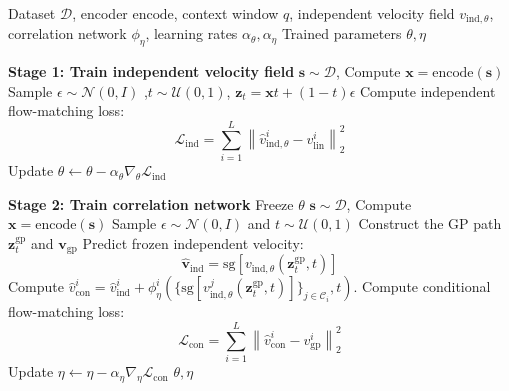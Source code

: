 \documentclass{article} %
\begin{document}
\begin{algorithm}[t]
\caption{Two-stage training of Correlation-aware Flow}
\label{alg:training}
\begin{algorithmic}[1]
\Require Dataset $\mathcal{D}$, encoder $\mathrm{encode}$, context window $q$, independent velocity field $v_{\mathrm{ind},\theta}$, correlation network $\phi_\eta$, learning rates $\alpha_\theta,\alpha_\eta$
\Ensure Trained parameters $\theta,\eta$

\Statex \textbf{Stage 1: Train independent velocity field}
    \State $\mathbf{s} \sim \mathcal{D} $, Compute  $\mathbf{x} = \mathrm{encode}(\mathbf{s})$
    \State Sample $\epsilon \sim \mathcal{N}(0,I)$ ,$t \sim \mathcal{U}(0,1)$, $\mathbf{z}_t = \mathbf{x} t + (1-t) \epsilon$
    \State Compute independent flow-matching loss:
    \[
        \mathcal{L}_{\mathrm{ind}}
        =
        \sum_{i=1}^{L}
        \left\|
            \widehat{v}^{i}_{\mathrm{ind}, \theta}
            -
            v^{i}_{\mathrm{lin}}
        \right\|_2^2
    \]
    \State Update $\theta \leftarrow \theta - \alpha_\theta \nabla_\theta \mathcal{L}_{\mathrm{ind}}$
\EndFor

\Statex \textbf{Stage 2: Train correlation network}
\State Freeze $\theta$
    \State $\mathbf{s} \sim \mathcal{D}$, Compute $\mathbf{x} = \mathrm{encode}(\mathbf{s})$
    \State Sample $\epsilon \sim \mathcal{N}(0,I)$ and $t \sim \mathcal{U}(0,1)$
    \State Construct the  GP path $\mathbf{z}^{\mathrm{gp}}_t$  and $\mathbf{v}_{\mathrm{gp}}$ 
    \State Predict frozen independent velocity:
    \[
        \widehat{\mathbf{v}}_{\mathrm{ind}}
        =
        \mathrm{sg}
        \left[
            v_{\mathrm{ind},\theta}(\mathbf{z}^{\mathrm{gp}}_t,t)
        \right]
    \]
    \State  Compute $\widehat{v}^{i}_{\mathrm{con}}=\widehat{v}^{i}_{\mathrm{ind}}+\phi^i_\eta\left(\{\mathrm{sg}
        \left[
            v^j_{\mathrm{ind},\theta}(\mathbf{z}^{\mathrm{gp}}_t,t)
        \right]\}_{j\in\mathcal{C}_i},t\right)$.
    \State Compute conditional flow-matching loss:
    \[
        \mathcal{L}_{\mathrm{con}}
        =
        \sum_{i=1}^{L}
        \left\|
            \widehat{v}^{i}_{\mathrm{con}}
            -
            v^{i}_{\mathrm{gp}}
        \right\|_2^2
    \]
    \State Update $\eta \leftarrow \eta - \alpha_\eta \nabla_\eta \mathcal{L}_{\mathrm{con}}$
\EndFor
\State \Return $\theta,\eta$
\end{algorithmic}
\end{algorithm}
\end{document}
